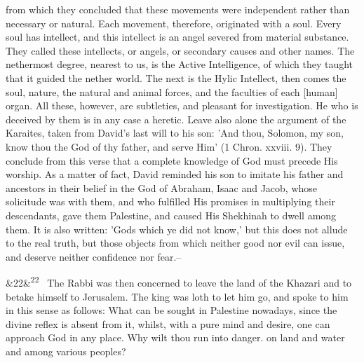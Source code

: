 \documentclass[12pt]{article}
\newcommand{\para}[1][]{\par\noindent\ifx&#1&\else\textsuperscript{\footnotesize #1}~\fi}
\begin{document}
from which they concluded that these movements were independent rather than necessary or natural. Each movement, therefore, originated with a soul. Every soul has intellect, and this intellect is an angel severed from material substance. They called these intellects, or angels, or secondary causes and other names. The nethermost degree, nearest to us, is the Active Intelligence, of which they taught that it guided the nether world. The next is the Hylic Intellect, then comes the soul, nature, the natural and animal forces, and the faculties of each [human] organ. All these, however, are subtleties, and pleasant for investigation. He who is deceived by them is in any case a heretic. Leave also alone the argument of the Karaites, taken from David's last will to his son: 'And thou, Solomon, my son, know thou the God of thy father, and serve Him' (1 Chron. xxviii. 9). They conclude from this verse that a complete knowledge of God must precede His worship. As a matter of fact, David reminded his son to imitate his father and ancestors in their belief in the God of Abraham, Isaac and Jacob, whose solicitude was with them, and who fulfilled His promises in multiplying their descendants, gave them Palestine, and caused His Shekhinah to dwell among them. It is also written: 'Gods which ye did not know,' but this does not allude to the real truth, but those objects from which neither good nor evil can issue, and deserve neither confidence nor fear.–

\para[22] The Rabbi was then concerned to leave the land of the Khazari and to betake himself to Jerusalem. The king was loth to let him go, and spoke to him in this sense as follows: What can be sought in Palestine nowadays, since the divine reflex is absent from it, whilst, with a pure mind and desire, one can approach God in any place. Why wilt thou run into danger. on land and water and among various peoples?
\end{document}
